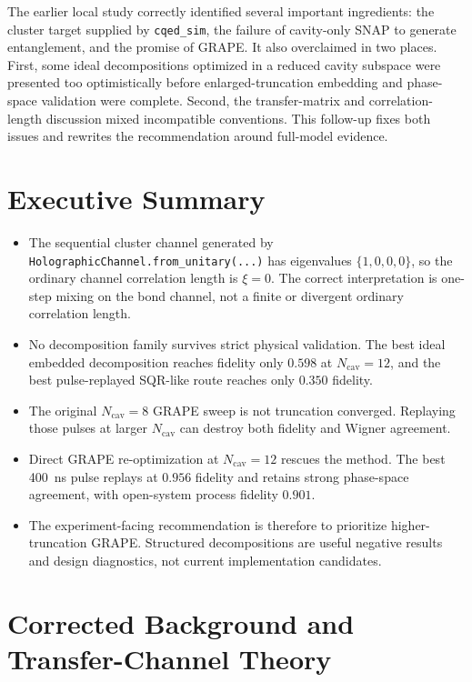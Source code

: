 \documentclass[aps,pra,twocolumn,reprint,amsmath,amssymb]{revtex4-2}
\begin{document}
The earlier local study correctly identified several important ingredients: the
cluster target supplied by \texttt{cqed\_sim}, the failure of cavity-only SNAP
to generate entanglement, and the promise of GRAPE. It also overclaimed in two
places. First, some ideal decompositions optimized in a reduced cavity
subspace were presented too optimistically before enlarged-truncation embedding
and phase-space validation were complete. Second, the transfer-matrix and
correlation-length discussion mixed incompatible conventions. This follow-up
fixes both issues and rewrites the recommendation around full-model evidence.

\section{Executive Summary}
\begin{itemize}
  \item The sequential cluster channel generated by
  \texttt{HolographicChannel.from\_unitary(...)} has eigenvalues
  $\{1,0,0,0\}$, so the ordinary channel correlation length is $\xi=0$. The
  correct interpretation is one-step mixing on the bond channel, not a finite
  or divergent ordinary correlation length.
  \item No decomposition family survives strict physical validation. The best
  ideal embedded decomposition reaches fidelity only $0.598$ at
  $N_{\mathrm{cav}}=12$, and the best pulse-replayed SQR-like route reaches
  only $0.350$ fidelity.
  \item The original $N_{\mathrm{cav}}=8$ GRAPE sweep is not truncation
  converged. Replaying those pulses at larger $N_{\mathrm{cav}}$ can destroy
  both fidelity and Wigner agreement.
  \item Direct GRAPE re-optimization at $N_{\mathrm{cav}}=12$ rescues the
  method. The best \SI{400}{ns} pulse replays at $0.956$ fidelity and retains
  strong phase-space agreement, with open-system process fidelity $0.901$.
  \item The experiment-facing recommendation is therefore to prioritize
  higher-truncation GRAPE. Structured decompositions are useful negative
  results and design diagnostics, not current implementation candidates.
\end{itemize}

\section{Corrected Background and Transfer-Channel Theory}
\end{document}
